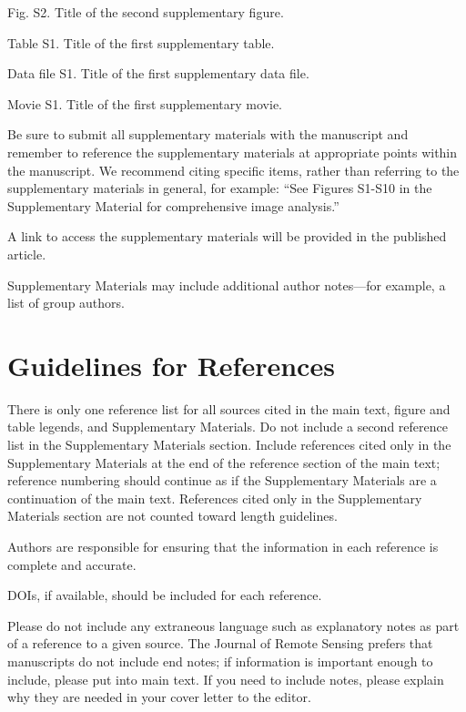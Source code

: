 \documentclass{article}
\begin{document}
Fig. S2. Title of the second supplementary figure.

Table S1. Title of the first supplementary table.

Data file S1. Title of the first supplementary data file.

Movie S1. Title of the first supplementary movie.

\medskip
Be sure to submit all supplementary materials with the manuscript and remember to reference the supplementary materials at appropriate points within the manuscript. We recommend citing specific items, rather than referring to the supplementary materials in general, for example: ``See Figures S1-S10 in the Supplementary Material for comprehensive image analysis.''

A link to access the supplementary materials will be provided in the published article.

Supplementary Materials may include additional author notes—for example, a list of group authors.

\section*{Guidelines for References}

There is only one reference list for all sources cited in the main text, figure and table legends, and Supplementary Materials. Do not include a second reference list in the Supplementary Materials section. Include references cited only in the Supplementary Materials at the end of the reference section of the main text; reference numbering should continue as if the Supplementary Materials are a continuation of the main text. References cited only in the Supplementary Materials section are not counted toward length guidelines.

Authors are responsible for ensuring that the information in each reference is complete and accurate.

DOIs, if available, should be included for each reference.

Please do not include any extraneous language such as explanatory notes as part of a reference to a given source. The Journal of Remote Sensing prefers that manuscripts do not include end notes; if information is important enough to include, please put into main text.  If you need to include notes, please explain why they are needed in your cover letter to the editor.

\printbibliography
\end{document}

